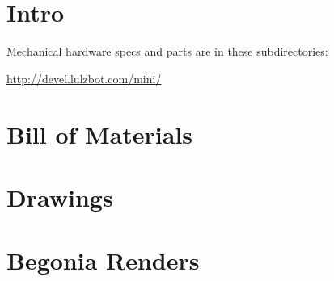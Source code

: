 %
%
%
%
%

\section{Intro}
Mechanical hardware specs and parts are in these subdirectories:

\url{http://devel.lulzbot.com/mini/}

\section{Bill of Materials}



\section{Drawings}








\section{Begonia Renders}

